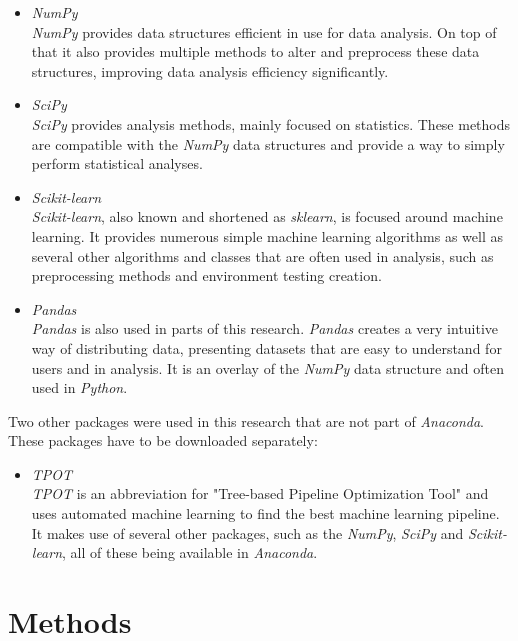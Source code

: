 \documentclass[10pt,a4paper]{report}
\begin{document}
	\begin{itemize}
		\item \textit{NumPy} \cite{walt2011NumPy} \\
		\textit{NumPy} provides data structures efficient in use for data analysis. On top of that it also provides multiple methods to alter and preprocess these data structures, improving data analysis efficiency significantly.
		\item \textit{SciPy} \cite{jones2014SciPy} \\
		\textit{SciPy} provides analysis methods, mainly focused on statistics. These methods are compatible with the \textit{NumPy} data structures and provide a way to simply perform statistical analyses.
		\item \textit{Scikit-learn} \cite{pedregosa2011scikit} \\
		\textit{Scikit-learn}, also known and shortened as \textit{sklearn}, is focused around machine learning. It provides numerous simple machine learning algorithms as well as several other algorithms and classes that are often used in analysis, such as preprocessing methods and environment testing creation.
		\item \textit{Pandas} \cite{mckinney2012Python} \\
		\textit{Pandas} is also used in parts of this research. \textit{Pandas} creates a very intuitive way of distributing data, presenting datasets that are easy to understand for users and in analysis. It is an overlay of the \textit{NumPy} data structure and often used in \textit{Python}.
	\end{itemize}
	
	Two other packages were used in this research that are not part of \textit{Anaconda}. These packages have to be downloaded separately:
	
	\begin{itemize}
		\item \textit{TPOT} \cite{olson2016tpot} \\
		\textit{TPOT} is an abbreviation for "Tree-based Pipeline Optimization Tool" and uses automated machine learning to find the best machine learning pipeline. It makes use of several other packages, such as the \textit{NumPy}, \textit{SciPy} and \textit{Scikit-learn}, all of these being available in \textit{Anaconda}.
	\end{itemize} 
	
	\section{Methods}
	\label{FSsec:Background}
	
\end{document}
